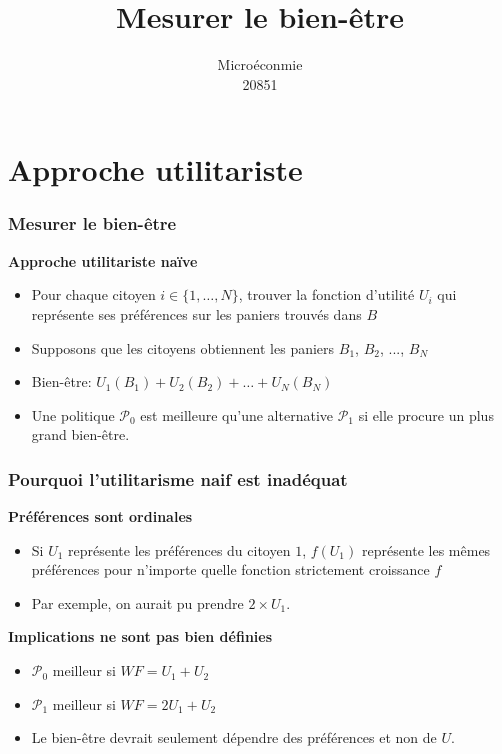 \documentclass[handout]{beamer}
\title{Mesurer le bien-être}
\author{Microéconmie \\ 20851}
\date{}
\newcommand{\mcl}{\mathcal}
\newcommand{\mdp}{\medskip \pause}
\begin{document}
\frame{\titlepage}

\section[Outline]{}
\frame{\tableofcontents}

\section{}

\section{Approche utilitariste}

\begin{frame}\frametitle{Mesurer le bien-être}

\textbf{Approche utilitariste naïve}

\begin{itemize} \item Pour chaque citoyen $i
\in \{1,\ldots,N\}$, trouver la fonction d'utilité $U_i$ qui représente ses préférences sur les paniers trouvés dans $B$
\item Supposons que les citoyens obtiennent les paniers $B_1$, $B_2$, ..., $B_N$

\item Bien-être: $U_1(B_1) + U_2(B_2) + \ldots + U_N(B_N)$
\item Une politique $\mcl P_0$ est meilleure qu'une alternative $\mcl P_1$ si elle procure un plus grand bien-être.
\end{itemize}
\end{frame}
 

\begin{frame}\frametitle{Pourquoi l'utilitarisme naif est inadéquat}
\textbf{Préférences sont ordinales} \begin{itemize}\item Si $U_1$ représente
les préférences du citoyen $1$, $f(U_1)$ représente les mêmes préférences pour n'importe quelle fonction strictement croissance  $f$ \item Par exemple, on aurait pu prendre $2
\times U_1$. \end{itemize}\mdp

\textbf{Implications ne sont pas bien définies} \begin{itemize} \item  $\mcl P_0$ meilleur si $WF = U_1 + U_2$
\item $\mcl P_1$ meilleur si $WF = 2U_1 + U_2$ \item Le bien-être devrait seulement dépendre des préférences et non de $U$. \end{itemize}

\end{frame}
\end{document}

